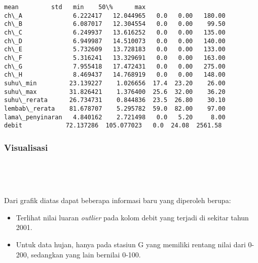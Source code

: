 \documentclass[11pt]{article}
\makeatletter
\providecommand{\tightlist}{%
      \setlength{\itemsep}{0pt}\setlength{\parskip}{0pt}}
\newcommand{\boxspacing}{\kern\kvtcb@left@rule\kern\kvtcb@boxsep}
\newcommand{\prompt}[4]{
        \ttfamily\llap{{\color{#2}[#3]:\hspace{3pt}#4}}\vspace{-\baselineskip}
    }
\makeatother
\begin{document}
            \begin{tcolorbox}[breakable, size=fbox, boxrule=.5pt, pad at break*=1mm, opacityfill=0]
\prompt{Out}{outcolor}{0}{\boxspacing}
\begin{Verbatim}[commandchars=\\\{\}]
                      mean         std   min    50\%      max
ch\_A              6.222417   12.044965   0.0   0.00   180.00
ch\_B              6.087017   12.304554   0.0   0.00    99.50
ch\_C              6.249937   13.616252   0.0   0.00   135.00
ch\_D              6.949987   14.510073   0.0   0.00   140.00
ch\_E              5.732609   13.728183   0.0   0.00   133.00
ch\_F              5.316241   13.329691   0.0   0.00   163.00
ch\_G              7.955418   17.472431   0.0   0.00   275.00
ch\_H              8.469437   14.768919   0.0   0.00   148.00
suhu\_min         23.139227    1.026656  17.4  23.20    26.00
suhu\_max         31.826421    1.376400  25.6  32.00    36.20
suhu\_rerata      26.734731    0.844836  23.5  26.80    30.10
lembab\_rerata    81.678707    5.295782  59.0  82.00    97.00
lama\_penyinaran   4.840162    2.721498   0.0   5.20     8.00
debit            72.137286  105.077023   0.0  24.08  2561.58
\end{Verbatim}
\end{tcolorbox}
        
    \hypertarget{visualisasi}{%
\subsubsection{Visualisasi}\label{visualisasi}}

    \begin{center}
    \end{center}
    { \hspace*{\fill} \\}
    
    \begin{center}
    \end{center}
    { \hspace*{\fill} \\}
    
    Dari grafik diatas dapat beberapa informasi baru yang diperoleh berupa:

\begin{itemize}
\tightlist
\item
  Terlihat nilai luaran \emph{outlier} pada kolom debit yang terjadi di
  sekitar tahun 2001.
\item
  Untuk data hujan, hanya pada stasiun G yang memiliki rentang nilai
  dari 0-200, sedangkan yang lain bernilai 0-100.
\end{itemize}
\end{document}
